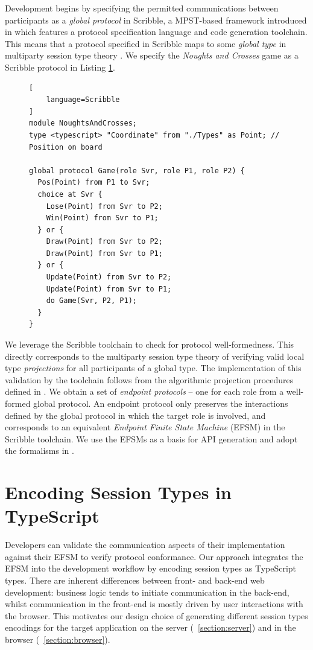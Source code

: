 \documentclass[submission,copyright,creativecommons]{eptcs}
\newcommand{\sectionref}[1]{\textsection~\ref{#1}}
\begin{document}
Development begins by specifying the permitted communications between participants as a \textit{global protocol} in Scribble, a MPST-based framework introduced in \cite{Scribble} which features a protocol specification language and code generation toolchain. This means that a protocol specified in Scribble maps to some \textit{global type} in multiparty session type theory \cite{MPST}. We specify the \textit{Noughts and Crosses} game as a Scribble protocol in Listing \ref{lst:game}.

\begin{figure}[!h]
\begin{lstlisting}[
	language=Scribble
]
module NoughtsAndCrosses;
type <typescript> "Coordinate" from "./Types" as Point;	// Position on board

global protocol Game(role Svr, role P1, role P2) {
  Pos(Point) from P1 to Svr;
  choice at Svr {
    Lose(Point) from Svr to P2;
    Win(Point) from Svr to P1;
  } or {
    Draw(Point) from Svr to P2;
    Draw(Point) from Svr to P1;
  } or {
    Update(Point) from Svr to P2;
    Update(Point) from Svr to P1;
    do Game(Svr, P2, P1);
  }
}
\end{lstlisting}
\label{lst:game}
\end{figure}

We leverage the Scribble toolchain to check for protocol
well-formedness. This directly corresponds to the multiparty session
type theory of verifying valid local type \textit{projections} for all
participants of a global type. The implementation of this validation
by the toolchain follows from the algorithmic projection procedures
defined in \cite{MPST}. We obtain a set of \textit{endpoint protocols}
-- one for each role from a well-formed global protocol. An endpoint protocol only preserves the interactions defined by the global protocol in which the target role is involved, and corresponds to an equivalent \textit{Endpoint Finite State Machine} (EFSM) in the Scribble toolchain. We use the EFSMs as a basis for API generation and adopt the formalisms in \cite{Hybrid2016}.


\section{Encoding Session Types in TypeScript}

Developers can validate the communication aspects of their
implementation against their EFSM to verify protocol conformance. Our
approach integrates the EFSM into the development workflow by encoding
session types as TypeScript types.
There are inherent differences between front- and back-end web development: business logic tends to initiate communication in the back-end, whilst communication in the front-end is mostly driven by user interactions with the browser. This motivates our design choice of generating different session types encodings for the target application on the server (\sectionref{section:server}) and in the browser (\sectionref{section:browser}).
\end{document}
